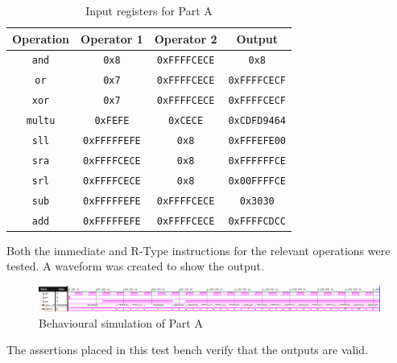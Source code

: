 \documentclass[CMPE]{../KGCOEReport}
\def\code#1{\texttt{#1}}
\begin{document}
    
    \begin{table}[H]
        \renewcommand{\arraystretch}{1.2}
        \setlength{\tabcolsep}{12pt}
        \caption{Input registers for Part A}
        \begin{center}
            \begin{tabular}{|c|c|c|c|}
                \hline
				Operation & Operator 1 & Operator 2 & Output\\\hline

				\code{and} & \code{0x8} & \code{0xFFFFCECE} & \code{0x8}\\\hline
				\code{or} & \code{0x7} & \code{0xFFFFCECE} & \code{0xFFFFCECF}\\\hline
				\code{xor} & \code{0x7} & \code{0xFFFFCECE} & \code{0xFFFFCECF}\\\hline
				\code{multu} & \code{0xFEFE} & \code{0xCECE} & \code{0xCDFD9464}\\\hline
				\code{sll} & \code{0xFFFFFEFE} & \code{0x8} & \code{0xFFFEFE00}\\\hline
				\code{sra} & \code{0xFFFFCECE} & \code{0x8} & \code{0xFFFFFFCE}\\\hline
				\code{srl} & \code{0xFFFFCECE} & \code{0x8} & \code{0x00FFFFCE}\\\hline
				\code{sub} & \code{0xFFFFFEFE} & \code{0xFFFFCECE} & \code{0x3030}\\\hline
				\code{add} & \code{0xFFFFFEFE} & \code{0xFFFFCECE} & \code{0xFFFFCDCC}\\\hline

            \end{tabular}
        \end{center}
        \label{tab:operations}
    \end{table}

	Both the immediate and R-Type instructions for the relevant operations
	were tested. A waveform was created to show the output.
	
	\begin{figure}[h!]
        \centering
        \includegraphics[width=\textwidth]{img/part_a_behav}
        \caption{Behavioural simulation of Part A}
        \label{fig:demo1}
	\end{figure}

	The assertions placed in this test bench verify that the outputs
	are valid.
	\\
	
\end{document}
